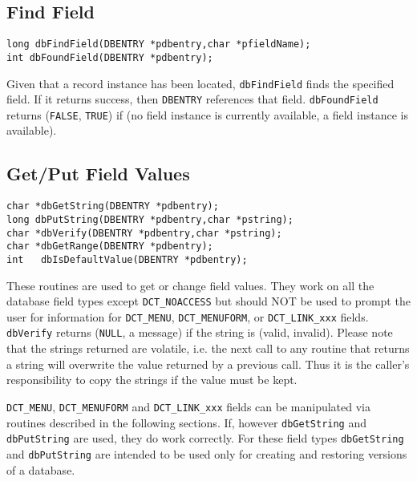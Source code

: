 \subsection{Find Field}

\begin{verbatim}
long dbFindField(DBENTRY *pdbentry,char *pfieldName);
int dbFoundField(DBENTRY *pdbentry);

\end{verbatim}

Given that a record instance has been located, \verb|dbFindField| finds the specified field. If it returns success, then 
\verb|DBENTRY| references that field. \verb|dbFoundField| returns (\verb|FALSE|, \verb|TRUE|) if (no field instance is currently available, a 
field instance is available).

\subsection{Get/Put Field Values}

\begin{verbatim}
char *dbGetString(DBENTRY *pdbentry);
long dbPutString(DBENTRY *pdbentry,char *pstring);
char *dbVerify(DBENTRY *pdbentry,char *pstring);
char *dbGetRange(DBENTRY *pdbentry);
int   dbIsDefaultValue(DBENTRY *pdbentry);
\end{verbatim}

These routines are used to get or change field values. They work on all the database field types except \verb|DCT_NOACCESS| 
but should NOT be used to prompt the user for information for \verb|DCT_MENU|, \verb|DCT_MENUFORM|, or \verb|DCT_LINK_xxx| fields. 
\verb|dbVerify| returns (\verb|NULL|, a message) if the string is (valid, invalid). Please note that the strings returned are volatile, i.e. 
the next call to any routine that returns a string will overwrite the value returned by a previous call. Thus it is the caller's 
responsibility to copy the strings if the value must be kept.

\verb|DCT_MENU|, \verb|DCT_MENUFORM| and \verb|DCT_LINK_xxx| fields can be manipulated via routines described in the following 
sections. If, however \verb|dbGetString| and \verb|dbPutString| are used, they do work correctly. For these field types 
\verb|dbGetString| and \verb|dbPutString| are intended to be used only for creating and restoring versions of a database.


